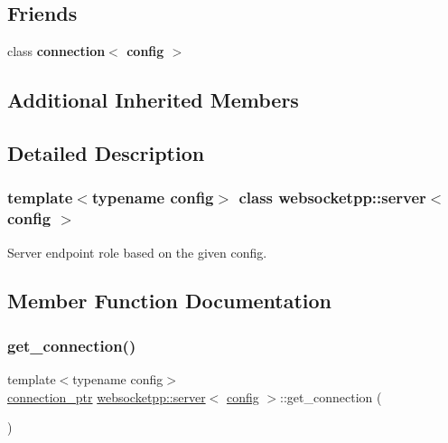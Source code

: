 \subsection*{Friends}
\begin{DoxyCompactItemize}
\item 
\mbox{\label{classwebsocketpp_1_1server_a408f6796a357de56c73c3beb2f13c61d}} 
class {\bfseries connection$<$ config $>$}
\end{DoxyCompactItemize}
\subsection*{Additional Inherited Members}


\subsection{Detailed Description}
\subsubsection*{template$<$typename config$>$\newline
class websocketpp\+::server$<$ config $>$}

Server endpoint role based on the given config. 

\subsection{Member Function Documentation}
\mbox{\label{classwebsocketpp_1_1server_a9146c63ed1afb5bdec29eca52c487226}} 
\subsubsection{\texorpdfstring{get\+\_\+connection()}{get\_connection()}}
{\footnotesize\ttfamily template$<$typename config$>$ \\
\mbox{\hyperlink{classwebsocketpp_1_1server_a0b93f09ceae3d1dafd2f7b1da759c2ad}{connection\+\_\+ptr}} \mbox{\hyperlink{classwebsocketpp_1_1server}{websocketpp\+::server}}$<$ \mbox{\hyperlink{classconfig}{config}} $>$\+::get\+\_\+connection (\begin{DoxyParamCaption}{ }\end{DoxyParamCaption})\hspace{0.3cm}{\ttfamily [inline]}}



